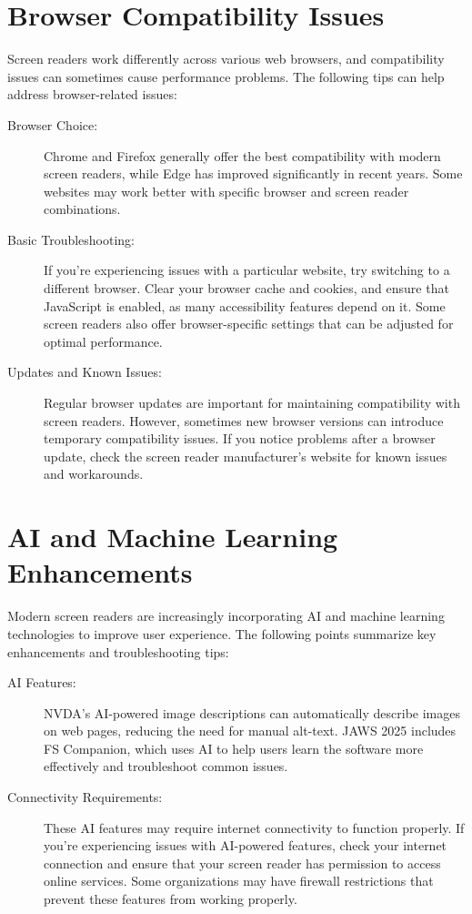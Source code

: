 \section{Browser Compatibility Issues}
\label{browser}
Screen readers work differently across various web browsers, and compatibility issues can sometimes cause performance problems. The following tips can help address browser-related issues:

\begin{description}
    \item[Browser Choice:] Chrome and Firefox generally offer the best compatibility with modern screen readers, while Edge has improved significantly in recent years. Some websites may work better with specific browser and screen reader combinations.
    \item[Basic Troubleshooting:] If you're experiencing issues with a particular website, try switching to a different browser. Clear your browser cache and cookies, and ensure that JavaScript is enabled, as many accessibility features depend on it. Some screen readers also offer browser-specific settings that can be adjusted for optimal performance.
    \item[Updates and Known Issues:] Regular browser updates are important for maintaining compatibility with screen readers. However, sometimes new browser versions can introduce temporary compatibility issues. If you notice problems after a browser update, check the screen reader manufacturer's website for known issues and workarounds.
\end{description}

\section{AI and Machine Learning Enhancements}
\label{ai}
Modern screen readers are increasingly incorporating AI and machine learning technologies to improve user experience. The following points summarize key enhancements and troubleshooting tips:

\begin{description}
    \item[AI Features:] NVDA's AI-powered image descriptions can automatically describe images on web pages, reducing the need for manual alt-text. JAWS 2025 includes FS Companion, which uses AI to help users learn the software more effectively and troubleshoot common issues.
    \item[Connectivity Requirements:] These AI features may require internet connectivity to function properly. If you're experiencing issues with AI-powered features, check your internet connection and ensure that your screen reader has permission to access online services. Some organizations may have firewall restrictions that prevent these features from working properly.
\end{description}

